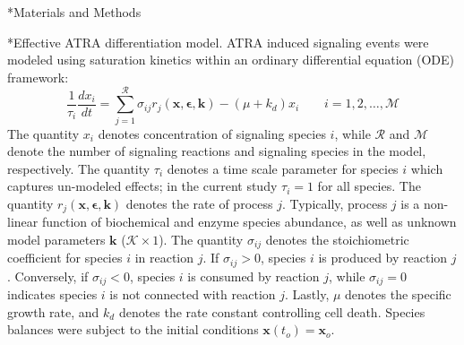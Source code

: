 \documentclass[12pt]{article}
\makeatletter
\renewcommand\subsubsection{\@startsection
	{subsubsection}{2}{0mm}
	{-0.05in}
	{-0.5\baselineskip}
	{\normalfont\normalsize\itshape}}
\renewcommand\section{\@startsection
	{subsection}{2}{0mm}
	{-0.2in}
	{0.05\baselineskip}
	{\normalfont\large\bfseries}}
\makeatother
\begin{document}
\clearpage

\section*{Materials and Methods}

\subsubsection*{Effective ATRA differentiation model.}
ATRA induced signaling events were modeled using saturation kinetics within an ordinary differential equation (ODE) framework:
\begin{equation}
	\frac{1}{\tau_{i}}\frac{dx_{i}}{dt}  =  \sum_{j = 1}^{\mathcal{R}}\sigma_{ij}r_{j}\left(\mathbf{x},\mathbf{\epsilon},\mathbf{k}\right)-\left(\mu + k_{d}\right) x_{i}\qquad{i=1,2,\hdots,\mathcal{M}}
\end{equation}
The quantity $x_{i}$ denotes concentration of signaling species $i$, while $\mathcal{R}$ and $\mathcal{M}$ denote the number of signaling reactions and signaling species in the model, respectively.
The quantity $\tau_{i}$ denotes a time scale parameter for species $i$ which captures un-modeled effects; in the current study $\tau_{i} = 1$ for all species.
The quantity $r_{j}\left(\mathbf{x},\mathbf{\epsilon},\mathbf{k}\right)$ denotes the rate of process $j$.
Typically, process $j$ is a non-linear function of biochemical and enzyme species abundance, as well as unknown model parameters $\mathbf{k}$ ($\mathcal{K}\times{1}$).
The quantity $\sigma_{ij}$ denotes the stoichiometric coefficient for species $i$ in reaction $j$.
If $\sigma_{ij}>0$, species $i$ is produced by reaction $j$.
Conversely, if $\sigma_{ij}<0$, species $i$ is consumed by reaction $j$, while $\sigma_{ij} = 0$ indicates species $i$ is not connected with reaction $j$.
Lastly, $\mu$ denotes the specific growth rate, and $k_{d}$ denotes the rate constant controlling cell death.
Species balances were subject to the initial conditions $\mathbf{x}\left(t_{o}\right) = \mathbf{x}_{o}$.
\end{document}
